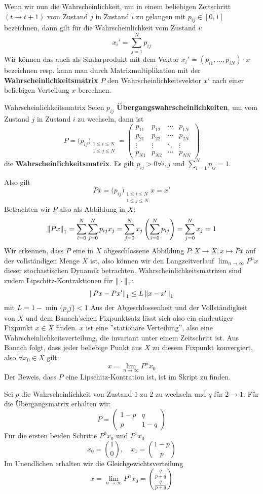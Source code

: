 Wenn wir nun die Wahrscheinlichkeit, um in einem beliebigen Zeitschritt $(t \to t+1)$ vom Zustand $j$ in Zustand $i$ zu gelangen mit $p_{ij} \in [0,1]$ bezeichnen, dann gilt für die Wahrscheinlichkeit vom Zustand $i$:
$$x_i' = \sum_{j=1}^N p_{ij}$$
Wir können das auch als Skalarprodukt mit dem Vektor $x_i' = (p_{i1}, ..., p_{iN})\cdot x$ bezeichnen resp. kann man durch Matrixmultiplikation mit der \textbf{Wahrscheinlichkeitsmatrix} $P$ den Wahrscheinlichkeitsvektor $x'$ nach einer beliebigen Verteilung $x$ berechnen.
\begin{definition}{Wahrscheinlichkeitsmatrix}{}
Seien $p_{ij}$ \textbf{Übergangswahrscheinlichkeiten}, um vom Zustand $j$ in Zustand $i$ zu wechseln, dann ist
$$P = \big(p_{ij}\big)_{\substack{1 \leq i \leq N\\1 \leq j \leq N}} = \begin{pmatrix}
p_{11} & p_{12} & \cdots & p_{1N}\\
p_{21} & p_{22} & \cdots & p_{2N}\\
\vdots & \vdots & \ddots & \vdots\\
p_{N1} & p_{N2} & \cdots & p_{NN}
\end{pmatrix}
$$
die \textbf{Wahrscheinlichkeitsmatrix}. Es gilt $p_{ij} > 0 \forall i,j$ und $\sum_{i = 1}^N p_{ij} = 1$.
\end{definition}
Also gilt $$Px = \big(p_{ij}\big)_{\substack{1 \leq i \leq N\\1 \leq j \leq N}} x = x'$$
Betrachten wir $P$ also als Abbildung in $X$:
$$\left\|Px\right\|_1 = \sum_{i=0}^N\sum_{j=0}^N p_{ij} x_j =  \sum_{j=0}^N x_j\left(\sum_{i=0}^N p_{ij}\right) = \sum_{j=0}^N x_j = 1$$
Wir erkennen, dass $P$ eine in $X$ abgeschlossene Abbildung $P: X \to X, x \mapsto Px$ auf der vollständigen Menge $X$ ist, also können wir den Langzeitverlauf $\lim_{n \to \infty} P^nx$ dieser stochastischen Dynamik betrachten. Wahrscheinlichkeitsmatrizen sind zudem Lipschitz-Kontraktionen für $\left\|\:\cdot\:\right\|_1$:
$$\left\|Px-Px'\right\|_1 \leq L \left\|x-x'\right\|_1$$
mit $L= 1- \min\{p_ij\} < 1$ Aus der Abgeschlossenheit und der Vollständigkeit von $X$ und dem Banach'schen Fixpunktsatz lässt sich also ein eindeutiger Fixpunkt $x \in X$ finden. $x$ ist eine ''stationäre Verteilung'', also eine Wahrscheinlichkeitsverteilung, die invariant unter einem Zeitschritt ist. Aus Banach folgt, dass jeder beliebige Punkt aus $X$ zu diesem Fixpunkt konvergiert, also $\forall x_0 \in X$ gilt:
$$x = \lim_{n \to \infty} P^nx_0$$
Der Beweis, dass $P$ eine Lipschitz-Kontration ist, ist im Skript zu finden.

\begin{example}
Sei $p$ die Wahrscheinlichkeit von Zustand $1$ zu $2$ zu wechseln und $q$ für $2 \to 1$. Für die Übergangsmatrix erhalten wir:
$$P = \begin{pmatrix}
1-p & q \\ p & 1-q
\end{pmatrix}$$
Für die ersten beiden Schritte $P^0x_0$ und $P^1x_0$
$$x_0 = \binom{1}{0}, \quad x_1 = \binom{1-p}{p}$$
Im Unendlichen erhalten wir die Gleichgewichtsverteilung
$$x = \lim_{n \to \infty}P^nx_0 = \binom{\frac{q}{p+q}}{\frac{q}{p+q}}$$
\end{example}

